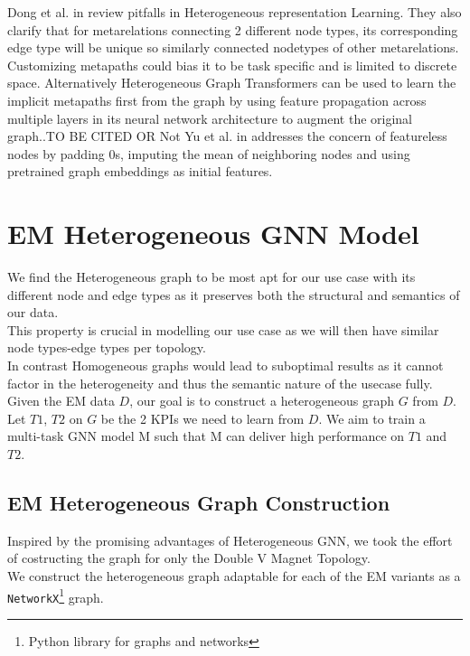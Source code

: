 \documentclass{report} %
\begin{document}
Dong et al. in \cite{HNRL-2020} review pitfalls in Heterogeneous representation Learning. They also clarify that for metarelations connecting 2 different node types,  
its corresponding edge type will be unique so similarly connected nodetypes of other metarelations. Customizing metapaths could bias it to be task specific and is limited to discrete space.
Alternatively Heterogeneous Graph Transformers can be used to learn the implicit metapaths first from the graph by using feature propagation across multiple layers in its 
neural network architecture to augment the original graph..TO BE CITED OR Not
Yu et al. in \cite{SHGNN-2020} addresses the concern of featureless nodes by padding 0s, imputing the mean of neighboring nodes and using pretrained graph embeddings as initial features.

\section{\ac{EM} Heterogeneous \ac{GNN} Model}\label{sec:EM Heterogeneous GNN Model}
We find the Heterogeneous graph to be most apt for our use case with its different node and edge types as it preserves both the structural and semantics of our data. \\
This property is crucial in modelling our use case as we will then have similar node types-edge types per topology. \\
In contrast Homogeneous graphs would lead to suboptimal results as it cannot factor in the heterogeneity and thus the semantic nature of the usecase fully. \\

Given the \ac{EM} data \( D\), our goal is to construct a heterogeneous graph \( G\) from \( D\). Let \( T1\), \( T2\) on \( G\) be the 2 \ac{KPI}s we need to learn from \( D\). 
We aim to train a multi-task \ac{GNN} model M such that M can deliver high performance on \( T1\) and \( T2\).

\subsection{\ac{EM} Heterogeneous Graph Construction}\label{subsec:EM Heterogeneous Graph Construction}
Inspired by the promising advantages of Heterogeneous \ac{GNN}, we took the effort of costructing the graph for only the Double V Magnet Topology.\\
We construct the heterogeneous graph adaptable for each of the \ac{EM} variants as a \texttt{NetworkX}\footnote{Python library for graphs and networks} graph.
\end{document}
